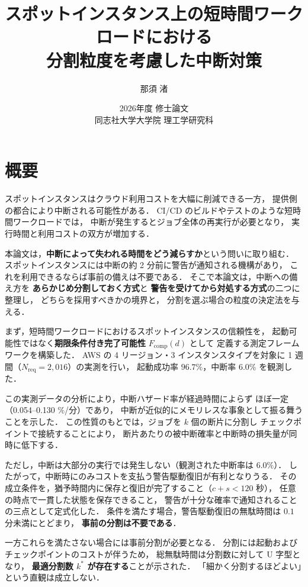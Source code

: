 \documentclass[11pt,a4paper]{ltjsreport}
\title{\vspace{-10mm}
スポットインスタンス上の短時間ワークロードにおける\\
分割粒度を考慮した中断対策}
\author{那須 渚}
\date{2026年度 修士論文\\[2mm] 同志社大学大学院 理工学研究科}
\newcommand{\Fcomp}{F_{\mathrm{comp}}}
\newcommand{\Nreq}{N_{\mathrm{req}}}
\begin{document}
\maketitle

\chapter*{概要}

スポットインスタンスはクラウド利用コストを大幅に削減できる一方，
提供側の都合により中断される可能性がある．
CI/CD のビルドやテストのような短時間ワークロードでは，
中断が発生するとジョブ全体の再実行が必要となり，
実行時間と利用コストの双方が増加する．

本論文は，\textbf{中断によって失われる時間をどう減らすか}という問いに取り組む．
スポットインスタンスには中断の約 2 分前に警告が通知される機構があり，
これを利用できるならば事前の備えは不要である．
そこで本論文は，中断への備え方を
\textbf{あらかじめ分割しておく方式}と
\textbf{警告を受けてから対処する方式}の二つに整理し，
どちらを採用すべきかの境界と，
分割を選ぶ場合の粒度の決定法を与える．

まず，短時間ワークロードにおけるスポットインスタンスの信頼性を，
起動可能性ではなく\textbf{期限条件付き完了可能性} $\Fcomp(d)$ として
定義する測定フレームワークを構築した．
AWS の 4 リージョン・3 インスタンスタイプを対象に
1 週間（$\Nreq = 2{,}016$）の実測を行い，
起動成功率 $96.7\%$，中断率 $6.0\%$ を観測した．

この実測データの分析により，中断ハザード率が経過時間によらず
ほぼ一定（0.054--0.130 \%/分）であり，
中断が近似的にメモリレスな事象として振る舞うことを示した．
この性質のもとでは，ジョブを $k$ 個の断片に分割し
チェックポイントで接続することにより，
断片あたりの被中断確率と中断時の損失量が同時に低下する．

ただし，中断は大部分の実行では発生しない（観測された中断率は $6.0\%$）．
したがって，中断時にのみコストを支払う警告駆動復旧が有利となりうる．
その成立条件を，猶予時間内に保存と復旧が完了すること（$c + s < 120$ 秒），
任意の時点で一貫した状態を保存できること，
警告が十分な確率で通知されることの三点として定式化した．
条件を満たす場合，警告駆動復旧の無駄時間は $0.1$ 分未満にとどまり，
\textbf{事前の分割は不要である}．

一方これらを満たさない場合には事前分割が必要となる．
分割には起動およびチェックポイントのコストが伴うため，
総無駄時間は分割数に対して U 字型となり，
\textbf{最適分割数 $k^{*}$ が存在する}ことが示された．
「細かく分割するほどよい」という直観は成立しない．
\end{document}
